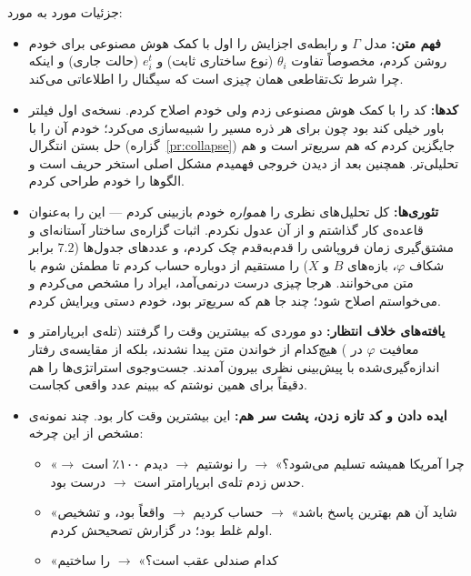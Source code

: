 \documentclass[12pt,a4paper]{article}
\begin{document}
جزئیات مورد به مورد:

\begin{itemize}[leftmargin=1.4em,itemsep=3pt]
  \item \textbf{فهم متن:} مدل $\Gamma$ و رابطه‌ی اجزایش را اول با کمک هوش
        مصنوعی برای خودم روشن کردم، مخصوصاً تفاوت $\theta_i$ (نوع ساختاری
        ثابت) و $e_i^t$ (حالت جاری) و اینکه چرا شرط تک‌تقاطعی همان چیزی است
        که سیگنال را اطلاعاتی می‌کند.
  \item \textbf{کدها:} کد را با کمک هوش مصنوعی زدم ولی خودم اصلاح کردم.
        نسخه‌ی اول فیلتر باور خیلی کند بود چون برای هر ذره مسیر را
        شبیه‌سازی می‌کرد؛ خودم آن را با حل بستن انتگرال
        (گزاره~\ref{pr:collapse}) جایگزین کردم که هم سریع‌تر است و هم
        تحلیلی‌تر. همچنین بعد از دیدن خروجی  فهمیدم مشکل
        اصلی استخر حریف است و الگوها را خودم طراحی کردم.
  \item \textbf{تئوری‌ها:} کل تحلیل‌های نظری را \emph{همواره} خودم بازبینی
        کردم — این را به‌عنوان قاعده‌ی کار گذاشتم و از آن عدول نکردم. اثبات
        گزاره‌ی ساختار آستانه‌ای و مشتق‌گیری زمان فروپاشی را قدم‌به‌قدم چک
        کردم، و عددهای جدول‌ها ($7.2$ برابر شکاف $\varphi$، بازه‌های $B$ و
        $X$) را مستقیم از  دوباره حساب کردم تا مطمئن شوم با
        متن می‌خوانند. هرجا چیزی درست درنمی‌آمد، ایراد را مشخص می‌کردم و
        می‌خواستم اصلاح شود؛ چند جا هم که سریع‌تر بود، خودم دستی ویرایش
        کردم.
  \item \textbf{یافته‌های خلاف انتظار:} دو موردی که بیشترین وقت را گرفتند
        (تله‌ی ابرپارامتر  و معافیت $\varphi$ در )
        هیچ‌کدام از خواندن متن پیدا نشدند، بلکه از مقایسه‌ی رفتار
        اندازه‌گیری‌شده با پیش‌بینی نظری بیرون آمدند. جست‌وجوی استراتژی‌ها را هم
        دقیقاً برای همین نوشتم که ببینم عدد واقعی کجاست.
  \item \textbf{ایده دادن و کد تازه زدن، پشت سر هم:} این بیشترین وقت کار
        بود. چند نمونه‌ی مشخص از این چرخه:
        \begin{itemize}[leftmargin=1.2em,itemsep=1pt]
          \item «چرا آمریکا همیشه تسلیم می‌شود؟» $\to$  را
                نوشتیم $\to$ دیدم ۱۰۰٪ است $\to$ حدس زدم تله‌ی ابرپارامتر
                است $\to$ درست بود.
          \item «شاید آن هم بهترین پاسخ باشد» $\to$ حساب کردیم $\to$
                واقعاً بود، و تشخیص اولم غلط بود؛ در گزارش تصحیحش کردم.
          \item «کدام صندلی عقب است؟» $\to$  را ساختیم

\end{itemize}
\end{itemize}
\end{document}
